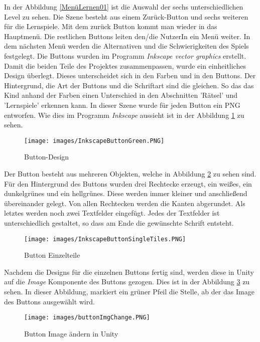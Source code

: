 In der Abbildung \ref{MenüLernen01} ist die Auswahl der sechs unterschiedlichen Level zu sehen. Die Szene besteht aus einem Zurück-Button und sechs weiteren für die Lernspiele. Mit dem zurück Button kommt man wieder in das Hauptmenü. Die restlichen Buttons leiten den/die NutzerIn ein Menü weiter. In dem nächsten Menü werden die Alternativen und die Schwierigkeiten des Spiels festgelegt. Die Buttons wurden im Programm \textit{Inkscape vector graphics} erstellt. Damit die beiden Teile des Projektes zusammenpassen, wurde ein einheitliches Design überlegt. Dieses unterscheidet sich in den Farben und in den Buttons. Der Hintergrund, die Art der Buttons und die Schriftart sind die gleichen. So das das Kind anhand der Farben einen Unterschied in den Abschnitten 'Rätsel' und 'Lernspiele' erkennen kann. In dieser Szene wurde für jeden Button ein PNG entworfen. Wie dies im Programm \textit{Inkscape} aussieht ist in der Abbildung \ref{ButtonInkscape} zu sehen.\\
\begin{figure}[htbp]
  \centering
  \texttt{[image: images/InkscapeButtonGreen.PNG]}
  \caption{Button-Design}
  \label{ButtonInkscape}
\end{figure}Der Button besteht aus mehreren Objekten, welche in Abbildung \ref{ButtonInkscapeSingleTiles} zu sehen sind. Für den Hintergrund des Buttons wurden drei Rechtecke erzeugt, ein weißes, ein dunkelgrünes und ein hellgrünes. Diese werden immer kleiner und anschließend übereinander gelegt. Von allen Rechtecken werden die Kanten abgerundet. Als letztes werden noch zwei Textfelder eingefügt. Jedes der Textfelder ist unterschiedlich gestaltet, so dass am Ende die gewünschte Schrift entsteht. 
\begin{figure}[htbp]
  \centering
  \texttt{[image: images/InkscapeButtonSingleTiles.PNG]}
  \caption{Button Einzelteile}
  \label{ButtonInkscapeSingleTiles}
\end{figure}
Nachdem die Designs für die einzelnen Buttons fertig sind, werden diese in Unity auf die \textit{Image} Komponente des Buttons gezogen. Dies ist in der Abbildung \ref{UnityButtonImgChange} zu sehen.
In dieser Abbildung, markiert ein grüner Pfeil die Stelle, ab der das Image des Buttons ausgewählt wird.
\begin{figure}[htbp]
  \centering
  \texttt{[image: images/buttonImgChange.PNG]}
  \caption{Button Image ändern in Unity}
  \label{UnityButtonImgChange}
\end{figure}

